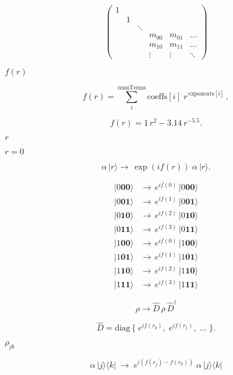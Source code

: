 \documentclass{article}
\begin{document}
\[
\begin{pmatrix}
1 \\
& 1 \\\
& & \ddots \\
& & & m_{00} & m_{01} & \dots  \\
& & & m_{10} & m_{11} & \dots \\
& & & \vdots & \vdots & \ddots
\end{pmatrix}
\]
\pagebreak

$f(r)$
\pagebreak

\[ 
   f(r) = \sum\limits_{i}^{\text{numTerms}} \text{coeffs}[i] \; r^{\, \text{exponents}[i]}\,,
  \]
\pagebreak

\[
      f(r) =  1 \, r^2 - 3.14 \, r^{-5.5}.
  \]
\pagebreak

$r$
\pagebreak

$r=0$
\pagebreak

\[
   \alpha \, |r\rangle \rightarrow \, \exp(i f(r)) \; \alpha \, |r\rangle.
  \]
\pagebreak

\[ 
  \begin{aligned}
    |0\mathbf{00}\rangle & \rightarrow \, e^{i f(0)}\,|0\mathbf{00}\rangle \\
    |0\mathbf{01}\rangle & \rightarrow \, e^{i f(1)}\,|0\mathbf{01}\rangle \\
    |0\mathbf{10}\rangle & \rightarrow \, e^{i f(2)}\,|0\mathbf{10}\rangle \\
    |0\mathbf{11}\rangle & \rightarrow \, e^{i f(3)}\,|0\mathbf{11}\rangle \\
    |1\mathbf{00}\rangle & \rightarrow \, e^{i f(0)}\,|1\mathbf{00}\rangle \\
    |1\mathbf{01}\rangle & \rightarrow \, e^{i f(1)}\,|1\mathbf{01}\rangle \\
    |1\mathbf{10}\rangle & \rightarrow \, e^{i f(2)}\,|1\mathbf{10}\rangle \\
    |1\mathbf{11}\rangle & \rightarrow \, e^{i f(3)}\,|1\mathbf{11}\rangle
  \end{aligned}
  \]
\pagebreak

\[
     \rho \rightarrow \hat{D} \, \rho \, \hat{D}^\dagger
  \]
\pagebreak

\[
     \hat{D} = \text{diag} \, \{ \; e^{i f(r_0)}, \; e^{i f(r_1)}, \;  \dots \; \}.
  \]
\pagebreak

$\rho_{jk}$
\pagebreak

\[
     \alpha \, |j\rangle\langle k| \; \rightarrow \; e^{i (f(r_j) - f(r_k))} \; \alpha \, |j\rangle\langle k|
  \]
\pagebreak
\end{document}
